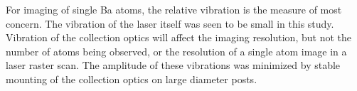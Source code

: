 


For imaging of single Ba atoms, the relative vibration is the measure of most concern.  The vibration of the laser itself was seen to be small in this study.  Vibration of the collection optics will affect the imaging resolution, but not the number of atoms being observed, or the resolution of a single atom image in a laser raster scan.  The amplitude of these vibrations was minimized by stable mounting of the collection optics on large diameter posts.





